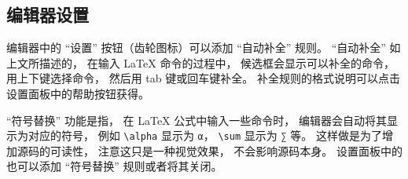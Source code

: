 \subsection{编辑器设置}
编辑器中的 “设置” 按钮（齿轮图标）可以添加 “自动补全” 规则。 “自动补全” 如上文所描述的， 在输入 LaTeX 命令的过程中， 候选框会显示可以补全的命令， 用上下键选择命令， 然后用 tab 键或回车键补全。 补全规则的格式说明可以点击设置面板中的帮助按钮获得。

“符号替换” 功能是指， 在 LaTeX 公式中输入一些命令时， 编辑器会自动将其显示为对应的符号， 例如 \verb|\alpha| 显示为 \lstinline|α|， \verb|\sum| 显示为 \lstinline|∑| 等。 这样做是为了增加源码的可读性， 注意这只是一种视觉效果， 不会影响源码本身。 设置面板中的也可以添加 “符号替换” 规则或者将其关闭。

